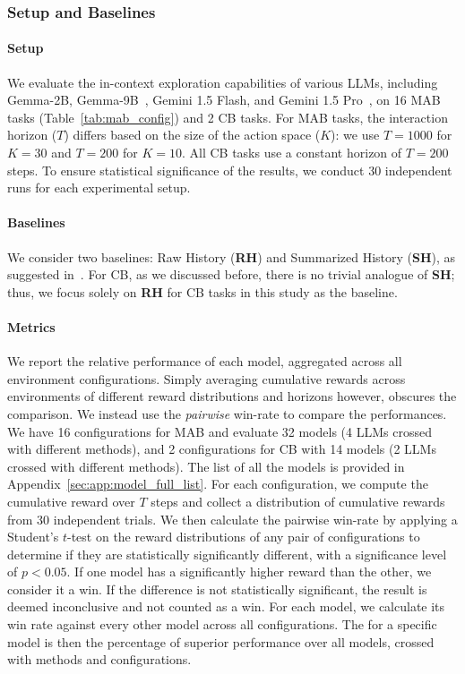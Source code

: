 \subsubsection{Setup and Baselines}
\label{subsubsec: setup}
\paragraph{Setup} We evaluate the in-context exploration capabilities of various LLMs, including Gemma-2B, Gemma-9B~\citep{team2024gemma}, Gemini 1.5 Flash, and Gemini 1.5 Pro~\citep{reid2024gemini}, on 16 MAB tasks (Table~\ref{tab:mab_config}) and 2 CB tasks.
For MAB tasks, the interaction horizon ($T$) differs based on the size of the action space ($K$): we use $T=1000$ for $K=30$ and $T=200$ for $K=10$.
All CB tasks use a constant horizon of $T = 200$ steps.
To ensure statistical significance of the results, we conduct 30 independent runs for each experimental setup.

\paragraph{Baselines} We consider two baselines: Raw History (\textbf{RH}) and Summarized History (\textbf{SH}), as suggested in~\citet{krishnamurthy2024can}.
For CB, as we discussed before, there is no trivial analogue of \textbf{SH}; thus, we focus solely on \textbf{RH} for CB tasks in this study as the baseline. 

\paragraph{Metrics}
We report the relative performance of each model, aggregated across all environment configurations. Simply averaging cumulative rewards across environments of different reward distributions and horizons however, obscures the comparison. We instead use the \emph{pairwise} win-rate to compare the performances. We have 16 configurations for MAB and evaluate 32 models (4 LLMs crossed with different methods), and 2 configurations for CB with 14 models (2 LLMs crossed with different methods).  The list of all the models is provided in Appendix~\ref{sec:app:model_full_list}. For each configuration, we compute the cumulative reward over 
$T$ steps and collect a distribution of cumulative rewards from 30 independent trials. We then calculate the pairwise win-rate by applying a Student's $t$-test on the reward distributions of any pair of configurations to determine if they are statistically significantly different, with a significance level of $p<0.05$. If one model has a significantly higher reward than the other, we consider it a win. If the difference is not statistically significant, the result is deemed inconclusive and not counted as a win.
For each model, we calculate its win rate against every other model across all configurations. The \emph{\awr} for a specific model is then the percentage of superior performance over all models, crossed with methods and configurations. 


